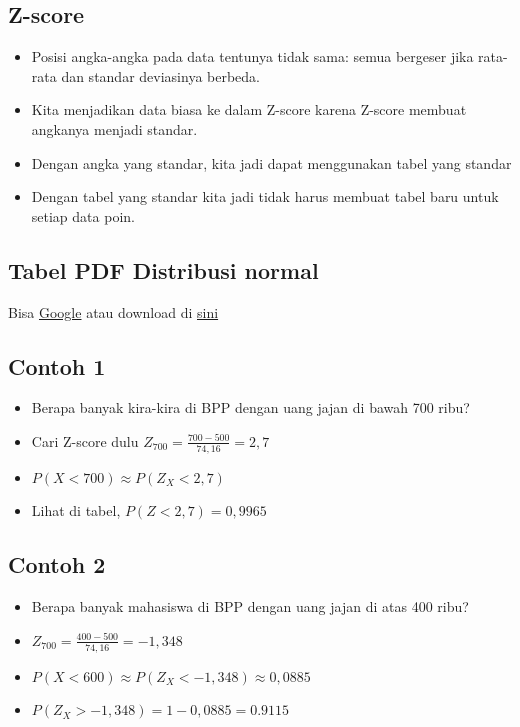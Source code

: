 \documentclass[
  letterpaper,
  DIV=11,
  numbers=noendperiod]{scrartcl}
\begin{document}
\subsection{Z-score}\label{z-score-3}

\begin{itemize}
\item
  Posisi angka-angka pada data tentunya tidak sama: semua bergeser jika
  rata-rata dan standar deviasinya berbeda.
\item
  Kita menjadikan data biasa ke dalam Z-score karena Z-score membuat
  angkanya menjadi standar.
\item
  Dengan angka yang standar, kita jadi dapat menggunakan tabel yang
  standar
\item
  Dengan tabel yang standar kita jadi tidak harus membuat tabel baru
  untuk setiap data poin.
\end{itemize}

\subsection{Tabel PDF Distribusi
normal}\label{tabel-pdf-distribusi-normal}

Bisa
\href{https://www.google.com/search?client=firefox-b-d&q=z+score+table}{Google}
atau download di
\href{https://drive.google.com/file/d/1ywI58hnM8p0ZyFV7B9rCOosk72iCGguq/view?usp=sharing}{sini}

\subsection{Contoh 1}\label{contoh-1-1}

\begin{itemize}
\item
  Berapa banyak kira-kira di BPP dengan uang jajan di bawah 700 ribu?
\item
  Cari Z-score dulu \(Z_{700}=\frac{700-500}{74,16}=2,7\)
\item
  \(P(X<700) \approx P(Z_X<2,7)\)
\item
  Lihat di tabel, \(P(Z<2,7)=0,9965\)
\end{itemize}

\subsection{Contoh 2}\label{contoh-2-1}

\begin{itemize}
\item
  Berapa banyak mahasiswa di BPP dengan uang jajan di atas 400 ribu?
\item
  \(Z_{700}=\frac{400-500}{74,16}=-1,348\)
\item
  \(P(X<600) \approx P(Z_X<-1,348) \approx 0,0885\)
\item
  \(P(Z_X>-1,348)=1-0,0885=0.9115\)
\end{itemize}
\end{document}
